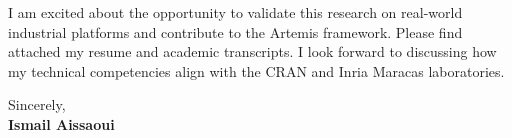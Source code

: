 \documentclass[11pt,a4paper]{article}
\begin{document}
\vspace{0.5em}
\noindent
I am excited about the opportunity to validate this research on real-world industrial platforms and contribute to the Artemis framework. Please find attached my resume and academic transcripts. I look forward to discussing how my technical competencies align with the CRAN and Inria Maracas laboratories.

\vspace{1.5em}
\noindent
Sincerely, \\[0.5em]
\textbf{Ismail Aissaoui}
\end{document}
